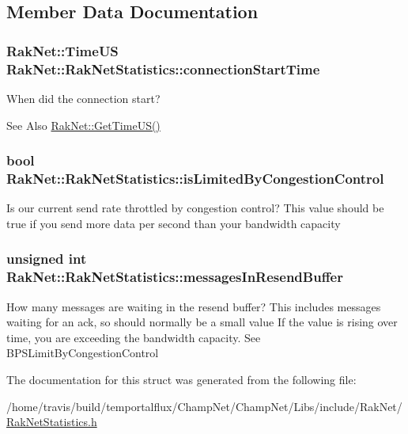 \subsection{Member Data Documentation}
\hypertarget{struct_rak_net_1_1_rak_net_statistics_aa4de4877ca5c69f70c4176e6d50b69ce}{
\subsubsection[{connection\-Start\-Time}]{\setlength{\rightskip}{0pt plus 5cm}Rak\-Net\-::\-Time\-U\-S Rak\-Net\-::\-Rak\-Net\-Statistics\-::connection\-Start\-Time}}\label{struct_rak_net_1_1_rak_net_statistics_aa4de4877ca5c69f70c4176e6d50b69ce}
When did the connection start? \begin{DoxySeeAlso}{See Also}
\hyperlink{namespace_rak_net_a0eb59672707865b233dd68a54db6c59f}{Rak\-Net\-::\-Get\-Time\-U\-S()} 
\end{DoxySeeAlso}
\hypertarget{struct_rak_net_1_1_rak_net_statistics_a7e8881dd2f72099037a69ba3cd0b989d}{
\subsubsection[{is\-Limited\-By\-Congestion\-Control}]{\setlength{\rightskip}{0pt plus 5cm}bool Rak\-Net\-::\-Rak\-Net\-Statistics\-::is\-Limited\-By\-Congestion\-Control}}\label{struct_rak_net_1_1_rak_net_statistics_a7e8881dd2f72099037a69ba3cd0b989d}
Is our current send rate throttled by congestion control? This value should be true if you send more data per second than your bandwidth capacity \hypertarget{struct_rak_net_1_1_rak_net_statistics_a6afad117322d397a65bccf2475e42d04}{
\subsubsection[{messages\-In\-Resend\-Buffer}]{\setlength{\rightskip}{0pt plus 5cm}unsigned int Rak\-Net\-::\-Rak\-Net\-Statistics\-::messages\-In\-Resend\-Buffer}}\label{struct_rak_net_1_1_rak_net_statistics_a6afad117322d397a65bccf2475e42d04}
How many messages are waiting in the resend buffer? This includes messages waiting for an ack, so should normally be a small value If the value is rising over time, you are exceeding the bandwidth capacity. See B\-P\-S\-Limit\-By\-Congestion\-Control 

The documentation for this struct was generated from the following file\-:\begin{DoxyCompactItemize}
\item 
/home/travis/build/temportalflux/\-Champ\-Net/\-Champ\-Net/\-Libs/include/\-Rak\-Net/\hyperlink{_rak_net_statistics_8h}{Rak\-Net\-Statistics.\-h}\end{DoxyCompactItemize}
